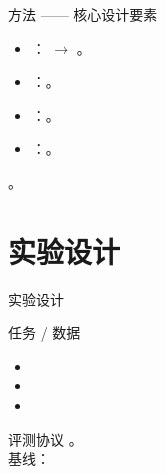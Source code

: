 
\begin{frame}{方法 —— 核心设计要素}
  \begin{itemize}
    \item {}： $\to$ 。
    \item {}：。
    \item {}：。
    \item {}：。
  \end{itemize}
  \tightgap
  \begin{callout}[要点]
    。
  \end{callout}
\end{frame}

\renewcommand{\secblurb}{\ph{本节一句话主旨：任务范围与评测协议}}
\section{实验设计}

\begin{frame}{实验设计}
  \begin{block}{任务 / 数据}
    \begin{itemize}
      \setlength{\itemsep}{0.3em}
      \item {}
      \item {}
      \item {}
    \end{itemize}
  \end{block}
  \tightgap
  \begin{exampleblock}{评测协议}
    \small {}。\\[0.15em]
    {\footnotesize\color{xmugrey} 基线：}
  \end{exampleblock}
\end{frame}


